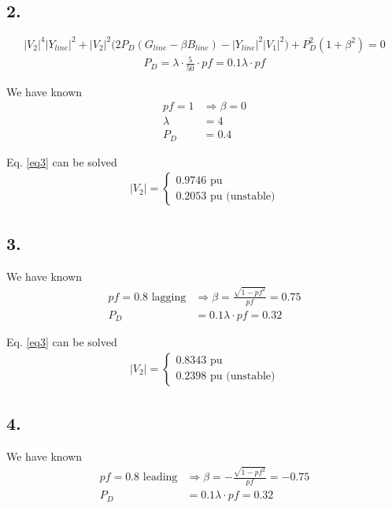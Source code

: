 \documentclass{article}
\begin{document}
\subsection*{2.}
\begin{equation}\label{eq3}
|V_2|^4 |Y_{line}|^2 + |V_2|^2 \Big(2 P_D (G_{line} - \beta B_{line}) - |Y_{line}|^2 |V_1|^2 \Big) + P_D^2 (1+\beta^2) = 0
\end{equation}
\begin{align*}
P_D = \lambda \cdot \frac{5}{50} \cdot pf = 0.1 \lambda \cdot pf
\end{align*}

We have known
\begin{align*}
pf = 1 &\Longrightarrow \beta = 0\\
\lambda &= 4\\
P_D &= 0.4
\end{align*}

Eq. \ref{eq3} can be solved
\begin{align*}
|V_2| =
\begin{cases}
0.9746 \text{ pu}\\
0.2053 \text{ pu (unstable)}
\end{cases}
\end{align*}

\subsection*{3.}
We have known
\begin{align*}
pf = 0.8 \text{ lagging} &\Longrightarrow \beta = \frac{\sqrt{1 - pf^2}}{pf} = 0.75\\
P_D &= 0.1 \lambda \cdot pf = 0.32
\end{align*}

Eq. \ref{eq3} can be solved
\begin{align*}
|V_2| =
\begin{cases}
0.8343 \text{ pu}\\
0.2398 \text{ pu (unstable)}
\end{cases}
\end{align*}

\subsection*{4.}
We have known
\begin{align*}
pf = 0.8 \text{ leading}&\Longrightarrow \beta = - \frac{\sqrt{1 - pf^2}}{pf} = -0.75\\
P_D &= 0.1 \lambda \cdot pf = 0.32
\end{align*}
\end{document}
